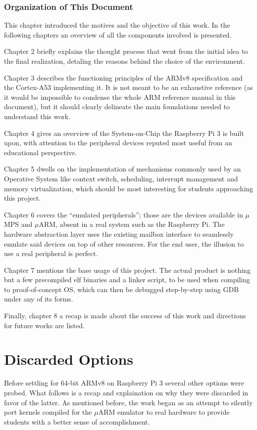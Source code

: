 \documentclass[12pt,a4paper,openright,twoside]{report}
\begin{document}
\subsection{Organization of This Document}
This chapter introduced the motives and the objective of this work. In the following
chapters an overview of all the components involved is presented.

Chapter 2 briefly explains the thought process that went from the initial idea
to the final realization, detaling the reasons behind the choice of the environment.

Chapter 3 describes the functioning principles of the ARMv8 specification and
 the Cortex-A53 implementing it. It is not meant to be an exhaustive reference 
 (as it would be impossible to condense the whole ARM reference manual in this
 document), but it should clearly delineate the main foundations needed to 
 understand this work.

Chapter 4 gives an overview of the System-on-Chip the Raspberry Pi 3 is built
upon, with attention to the peripheral devices reputed most useful from an 
educational perspective.

Chapter 5 dwells on the implementation of mechanisms commonly used by an Operative
System like context switch, scheduling, interrupt management and memory virtualization,
which should be most interesting for students approaching this project.

Chapter 6 covers the ``emulated peripherals''; those are the devices available in 
$\mu$MPS and $\mu$ARM, absent in a real system such as the Raspberry Pi. The hardware
abstraction layer uses the existing mailbox interface to seamlessly emulate said
devices on top of other resources. For the end user, the illusion to use a real
peripheral is perfect.

Chapter 7 mentions the base usage of this project. The actual product is nothing
but a few precompiled elf binaries and a linker script, to be used when compiling
to proof-of-concept OS, which can then be debugged step-by-step using GDB under
any of its forms.

Finally, chapter 8 a recap is made about the success of this work and directions
for future works are listed.

\clearpage{\pagestyle{empty}\cleardoublepage}
\chapter{Discarded Options}
Before settling for 64-bit ARMv8 on Raspberry Pi 3 several other options were 
probed. What follows is a recap and explaination on why they were discarded
in favor of the latter. As mentioned before, the work began as an attempt to
silently port kernels compiled for the $\mu$ARM emulator to real hardware to 
provide students with a better sense of accomplishment.
\end{document}
